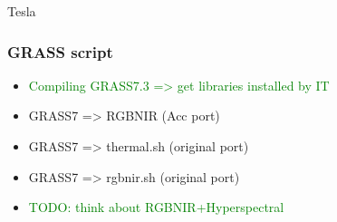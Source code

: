 \documentclass[serif,mathserif,aspectratio=169]{beamer}
\begin{document}

{
\begin{frame}[plain]
\begin{shaded}
\Huge Tesla
\end{shaded}
\end{frame}}


\begin{frame}
  \frametitle{GRASS script}
\begin{center}
\begin{itemize}
 \item \textcolor{green}{Compiling GRASS7.3 => get libraries installed by IT}
 \item GRASS7 => RGBNIR (Acc port)
 \item GRASS7 => thermal.sh (original port)
 \item GRASS7 => rgbnir.sh (original port)
 \item \textcolor{green}{TODO: think about RGBNIR+Hyperspectral}
\end{itemize}
\end{center}
\end{frame}

\end{document}
